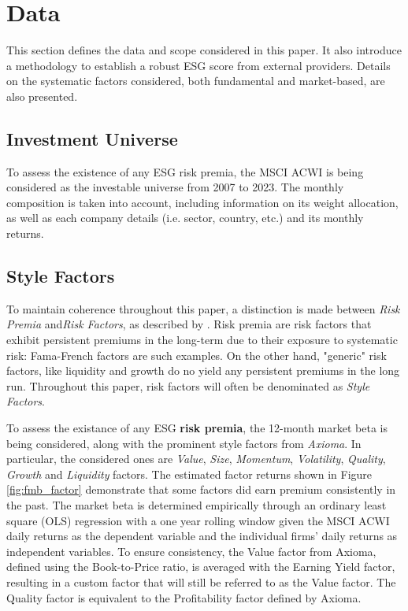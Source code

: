 \documentclass[11pt,a4paper]{article}
\begin{document}
\clearpage

\section{Data}\label{sec:data}

This section defines the data and scope considered in this paper. It also introduce a methodology to establish a robust ESG score from external providers. 
Details on the systematic factors considered, both fundamental and market-based, are also presented.  

\subsection{Investment Universe}

To assess the existence of any ESG risk premia, the MSCI ACWI is being considered as the investable universe from 2007 to 2023. 
The monthly composition is taken into account, including information on its weight allocation, as well as each company details (i.e. sector, country, etc.) and its monthly returns. 

\subsection{Style Factors}\label{subsec:style_factor}

To maintain coherence throughout this paper, a distinction is made between \textit{Risk Premia} and\textit{Risk Factors}, as described by . 
Risk premia are risk factors that exhibit persistent premiums in the long-term due to their exposure to systematic risk: Fama-French factors are such examples.
On the other hand, "generic" risk factors, like liquidity and growth do no yield any persistent premiums in the long run. 
Throughout this paper, risk factors will often be denominated as \textit{Style Factors}.

To assess the existance of any ESG \textbf{risk premia}, the 12-month market beta is being considered, along with the prominent style factors from \textit{Axioma}. In particular, the considered ones are \textit{Value}, \textit{Size}, \textit{Momentum}, \textit{Volatility}, \textit{Quality}, \textit{Growth} and \textit{Liquidity} factors. 
The estimated factor returns shown in Figure \ref{fig:fmb_factor} demonstrate that some factors did earn premium consistently in the past. 
The market beta is determined empirically through an ordinary least square (OLS) regression with a one year rolling window given the MSCI ACWI daily returns as the dependent variable and the individual firms' daily returns as independent variables. 
To ensure consistency, the Value factor from Axioma, defined using the Book-to-Price ratio, is averaged with the Earning Yield factor, resulting in a custom factor that will still be referred to as the Value factor. 
The Quality factor is equivalent to the Profitability factor defined by Axioma. 
\end{document}
